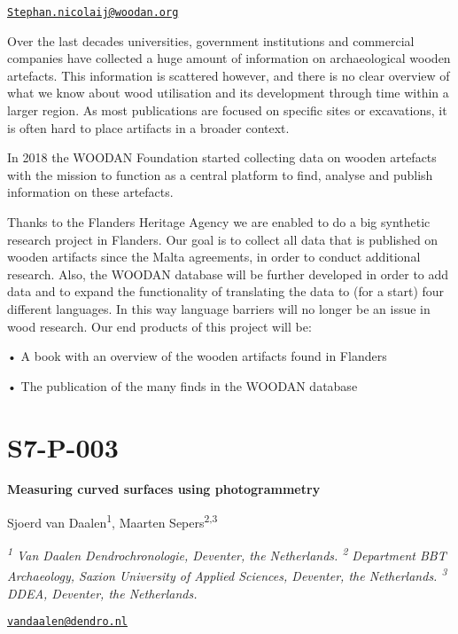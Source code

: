 \documentclass[
]{book}
\begin{document}
\href{mailto:Stephan.nicolaij@woodan.org}{\nolinkurl{Stephan.nicolaij@woodan.org}}

Over the last decades universities, government institutions and commercial companies have collected a huge amount of information on archaeological wooden artefacts. This information is scattered however, and there is no clear overview of what we know about wood utilisation and its development through time within a larger region. As most publications are focused on specific sites or excavations, it is often hard to place artifacts in a broader context.

In 2018 the WOODAN Foundation started collecting data on wooden artefacts with the mission to function as a central platform to find, analyse and publish information on these artefacts.

Thanks to the Flanders Heritage Agency we are enabled to do a big synthetic research project in Flanders. Our goal is to collect all data that is published on wooden artifacts since the Malta agreements, in order to conduct additional research. Also, the WOODAN database will be further developed in order to add data and to expand the functionality of translating the data to (for a start) four different languages. In this way language barriers will no longer be an issue in wood research. Our end products of this project will be:

• A book with an overview of the wooden artifacts found in Flanders

• The publication of the many finds in the WOODAN database

\hypertarget{s7-p-003}{%
\section*{S7-P-003}\label{s7-p-003}}

\textbf{Measuring curved surfaces using photogrammetry}

Sjoerd van Daalen\textsuperscript{1}, Maarten Sepers\textsuperscript{2,3}

\emph{\textsuperscript{1} Van Daalen Dendrochronologie, Deventer, the Netherlands. \textsuperscript{2} Department BBT Archaeology, Saxion University of Applied Sciences, Deventer, the Netherlands. \textsuperscript{3} DDEA, Deventer, the Netherlands.}

\href{mailto:vandaalen@dendro.nl}{\nolinkurl{vandaalen@dendro.nl}}
\end{document}
